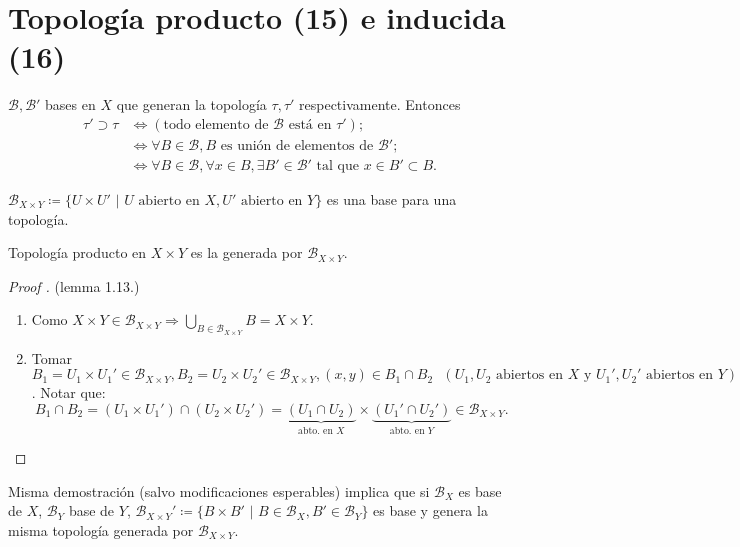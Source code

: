 
\section{Topología producto (15) e inducida (16)}

\begin{lemma}
	$\mathcal{B},\mathcal{B}'$ bases en $X$ que generan la topología $\tau,\tau'$ respectivamente. Entonces
	\begin{align*}
		\tau' \supset \tau & \iff (\text{todo elemento de } \mathcal{B} \text{ está en } \tau'); \\
		& \iff \forall B \in \mathcal{B}, B \text{ es unión de elementos de } \mathcal{B}'; \\
		& \iff \forall B \in \mathcal{B}, \forall x \in B, \exists B' \in \mathcal{B}' \text{ tal que } x \in B' \subset B
	.\end{align*}
\end{lemma}

\begin{lemma}
	$\mathcal{B}_{X \times Y} \coloneq \{ U \times U' \text{ | } U \text{ abierto en } X, U' \text{ abierto en } Y \}$ es una base para una topología.
\end{lemma}

\begin{definition}
	Topología producto en $X \times Y$ es la generada por $\mathcal{B}_{X \times Y}$.
\end{definition}

\begin{proof}[Proof ] (lemma 1.13.)
	\begin{enumerate}
		\item Como $X \times Y \in \mathcal{B}_{X \times Y} \Rightarrow \bigcup_{B \in \mathcal{B}_{X \times Y}} B = X \times Y$.

		\item Tomar $B_1 = U_1 \times U_1' \in \mathcal{B}_{X \times Y}, B_2 = U_2 \times U_2' \in \mathcal{B}_{X \times Y}, (x,y) \in B_1 \cap B_2 \text{ } (U_1,U_2 \text{ abiertos en } X \text{ y } U_1',U_2' \text{ abiertos en } Y)$. Notar que:
		\[
		B_1 \cap B_2 = (U_1 \times U_1') \cap (U_2 \times U_2') = \underbrace{(U_1 \cap U_2)}_{\text{abto. en } X} \times \underbrace{(U_1' \cap U_2')}_{\text{abto. en } Y} \in \mathcal{B}_{X \times Y}.
		\]
	\end{enumerate}
\end{proof}

\begin{note}
	Misma demostración (salvo modificaciones esperables) implica que si $\mathcal{B}_X$ es base de $X$, $\mathcal{B}_Y$ base de $Y$, $\mathcal{B}_{X \times Y}' \coloneq \{ B \times B' \text{ | } B \in \mathcal{B}_X, B' \in \mathcal{B}_Y \}$ es base y genera la misma topología generada por $\mathcal{B}_{X \times Y}$.  
\end{note}

